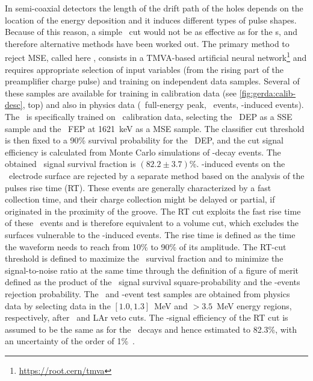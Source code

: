 In semi-coaxial detectors the length of the drift path of the holes depends on the
location of the energy deposition and it induces different types of pulse shapes. Because
of this reason, a simple \aoe\ cut would not be as effective as for the \bege{}s, and
therefore alternative methods have been worked out.
\newpar
The primary method to reject MSE, called here \annmse, consists in a TMVA-based artificial
neural network\footnote{\url{https://root.cern/tmva}} and requires appropriate selection
of input variables (from the rising part of the preamplifier charge pulse) and training on
independent data samples. Several of these samples are available for training in
calibration data (see \cref{fig:gerda:calib-desc}, top) and also in physics data (\kvz\
full-energy peak, \nnbb\ events, \a-induced events). The \annmse\ is specifically trained
on \Th\ calibration data, selecting the \Tl\ DEP as a SSE sample and the \Bil\ FEP at
1621~keV as a MSE sample. The classifier cut threshold is then fixed to a 90\% survival
probability for the \Th\ DEP, and the cut signal efficiency is calculated from Monte Carlo
simulations of \onbb-decay events. The obtained \annmse\ signal survival fraction is
$(82.2 \pm 3.7)$\%.
\newpar
\a-induced events on the \pplus\ electrode surface are rejected by a separate method based
on the analysis of the pulses rise time (RT). These events are generally characterized by
a fast collection time, and their charge collection might be delayed or partial, if
originated in the proximity of the groove. The RT cut exploits the fast rise time of these
\a\ events and is therefore equivalent to a volume cut, which excludes the surfaces
vulnerable to the \a-induced events. The rise time is defined as the time the waveform
needs to reach from 10\% to 90\% of its amplitude. The RT-cut threshold is defined to
maximize the \onbb\ survival fraction and to minimize the signal-to-noise ratio at the
same time through the definition of a figure of merit defined as the product of the \nnbb\
signal survival square-probability and the \a-events rejection probability. The \nnbb\ and
\a-event test samples are obtained from physics data by selecting data in the $[1.0,
1.3]$~MeV and $>3.5$~MeV energy regions, respectively, after \annmse\ and LAr veto cuts.
The \onbb-signal efficiency of the RT cut is assumed to be the same as for the \nnbb\
decays and hence estimated to 82.3\%, with an uncertainty of the order of
1\%~\cite{Lazzaro2019}.

